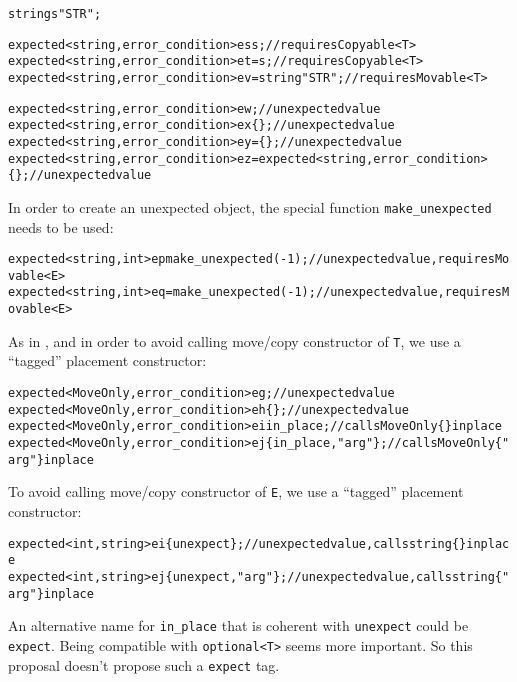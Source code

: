 \documentclass[a4paper,10pt]{article}
\newcommand{\cpp}[1]{\lstinline{#1}}
\begin{document}
\begin{alltt}
string s{"STR"};

expected<string, error_condition> es{s};              // requires Copyable<T>
expected<string, error_condition> et = s;             // requires Copyable<T>
expected<string, error_condition> ev = string{"STR"}; // requires Movable<T>

expected<string, error_condition> ew;                 // unexpected value
expected<string, error_condition> ex\{\};               // unexpected value
expected<string, error_condition> ey = \{\};            // unexpected value
expected<string,error_condition> ez = expected<string,error_condition>\{\};  // unexpected value
\end{alltt}

\noindent
In order to create an unexpected object, the special function \cpp{make_unexpected} needs to be used:

\begin{alltt}
expected<string, int> ep{make_unexpected(-1)};    // unexpected value, requires Movable<E>
expected<string, int> eq = make_unexpected(-1);   // unexpected value, requires Movable<E>
\end{alltt}

\noindent
As in \cite{OptionalRev4}, and in order to avoid calling move/copy constructor of \cpp{T}, we use a ``tagged'' placement constructor: 

\begin{alltt}
expected<MoveOnly, error_condition> eg;                  // unexpected value
expected<MoveOnly, error_condition> eh\{\};                // unexpected value
expected<MoveOnly, error_condition> ei{in_place};        // calls MoveOnly\{\} in place
expected<MoveOnly, error_condition> ej\{in_place, "arg"\}; // calls MoveOnly\{"arg"\} in place
\end{alltt}

\noindent
To avoid calling move/copy constructor of \cpp{E}, we use a ``tagged'' placement constructor: 

\begin{alltt}
expected<int, string> ei\{unexpect\};         // unexpected value, calls string\{\} in place
expected<int, string> ej\{unexpect, "arg"\};  // unexpected value, calls string\{"arg"\} in place
\end{alltt}

\noindent
An alternative name for \cpp{in_place} that is coherent with \cpp{unexpect} could be \cpp{expect}. Being compatible with \cpp{optional<T>} seems more important. So this proposal doesn't propose such a \cpp{expect} tag.
\newline
\end{document}
